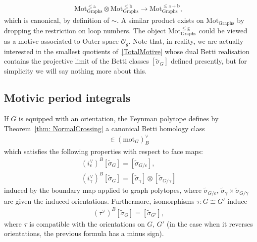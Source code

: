 \documentclass[pdftex]{sigma}%
\numberwithin{equation}{section}
\newcommand{\To}{\longrightarrow}
\newcommand{\0}{\color{blue}{\mathsf{0}}}
\begin{document}
\begin{gather*}
\mathrm{Mot^{\leq a}_{Graphs}}\otimes \mathrm{Mot^{\leq b}_{Graphs}} \To \mathrm{Mot^{\leq a+b}_{Graphs}} ,
\end{gather*}
which is canonical, by definition of $\sim$. A similar product exists on $\mathrm{Mot_{Graphs}}$ by dropping the restriction on loop numbers.
The object $\mathrm{Mot_{Graphs}^{\leq g}}$ could be viewed as a motive associated to Outer space $\mathcal{O}_g$. Note that, in reality, we are actually interested in the smallest quotients of~\eqref{TotalMotive} whose dual Betti realisation contains the projective limit of the Betti classes $[\widetilde{\sigma}_G]$ defined presently, but for simplicity we will say nothing more about this.

\subsection{Motivic period integrals}
If $G$ is equipped with an orientation, the Feynman polytope defines by Theorem~\ref{thm: NormalCrossing} a canonical Betti homology class
\begin{gather*}
[\widetilde{\sigma}_G] \in (\mathrm{mot}_G)^{\vee}_B
\end{gather*}
which satisfies the following properties with respect to face maps:
\begin{gather*}
(i^{\vee}_e)^{B} [\widetilde{\sigma}_G] = [\widetilde{\sigma}_{G/e}],
\\
 (i^{\vee}_{\gamma})^{B} [\widetilde{\sigma}_G] =
 [\widetilde{\sigma}_{\gamma}] \otimes [\widetilde{\sigma}_{G/\gamma}]
\end{gather*}
induced by the boundary map applied to graph polytopes, where $\widetilde{\sigma}_{G/e}$, $\widetilde{\sigma}_{\gamma}\times \widetilde{\sigma}_{G/\gamma}$ are given the induced orientations. Furthermore, isomorphisms $\tau\colon G \cong G'$ induce
\begin{gather*}
 (\tau^{\vee})^B [\widetilde{\sigma}_G] = [\widetilde{\sigma}_{G'}],
 \end{gather*}
where $\tau$ is compatible with the orientations on $G$, $G'$ (in the case when it reverses orientations, the previous formula has a minus sign).
\end{document}
